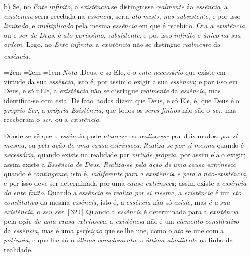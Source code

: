 \documentclass[12pt,a4paper]{article}
\newcommand{\pg}[1]{\thinspace\textup{[\,#1\,]}\thinspace}
\newcommand{\subp}[1]{\medskip\noindent#1)\quad}
\renewcommand\footnote[1]{%
    \stepcounter{footnote}\textsuperscript{\thefootnote}%
    \par
    {\footnotesize
     \leftskip=2em \rightskip=2em \parindent=1em
     \addvspace{\medskipamount}%
     \noindent\textit{Nota \thefootnote.}\enspace #1\par
     \addvspace{\medskipamount}}%
  }
\begin{document}
\subp{b} Se, no \emph{Ente infinito}, a \emph{existência} se distinguisse
\emph{realmente} da \emph{essência}, a \emph{existência} seria recebida na
\emph{essência}, seria \emph{ato misto}, \emph{não-subsistente}, e por isso
\emph{limitado}, e \emph{multiplicado} pela mesma \emph{essência} em que é
recebido. Ora a \emph{existência}, ou o \emph{ser de Deus}, é \emph{ato
puríssimo}, \emph{subsistente}, e por isso \emph{infinito} e \emph{único na sua
ordem}. Logo, no \emph{Ente infinito}, a \emph{existência} não se distingue
\emph{realmente} da \emph{essência}.\footnote{Deus, e só Ele, é o \emph{ente
necessário} que existe em virtude da sua \emph{essência}, isto é, por assim o
exigir a sua \emph{essência}; e por isso em Deus, e só nEle, a \emph{existência}
não se distingue \emph{realmente} da \emph{essência}, mas identifica-se com
esta. De fato, todos dizem \textemdash{} que Deus, e só Ele, é, \textemdash{}
que Deus é o \emph{próprio Ser}, a \emph{própria Existência}, \textemdash{} que
todos os \emph{seres finitos} não são o \emph{ser}, mas receberam o \emph{ser},
ou a \emph{existência}.

  Donde se vê que a \emph{essência} pode \emph{atuar-se} ou \emph{realizar-se}
  por dois modos: \emph{por si mesma}, ou \emph{pela ação de uma causa
  extrínseca}. \emph{Realiza-se por si mesma} quando é \emph{necessária}, quando
  existe na realidade por \emph{virtude própria}, por assim ela o exigir; assim
  existe a \emph{Essência de Deus}. \emph{Realiza-se pela ação de uma causa
  extrínseca} quando é \emph{contingente}, isto é, \emph{indiferente para a
  existência e para a não-existência}, e por isso deve ser determinada por uma
  \emph{causa extrínseca}; assim existe a \emph{essência do ente finito}.
  \textemdash{} Quando a \emph{essência} se \emph{realiza por si mesma}, a
  \emph{existência} é um \emph{ato constitutivo} da mesma \emph{essência}, isto
  é, a \emph{essência} não só \emph{existe}, mas \emph{é a sua existência}, o
  \emph{seu ser}. \pg{320} Quando a \emph{essência} é determinada para a
  \emph{existência} pela \emph{ação de uma causa extrínseca}, a \emph{existência}
  não é um \emph{elemento constitutivo} da \emph{essência}, mas é uma
  \emph{perfeição} que se lhe une, como o \emph{ato} se une com a
  \emph{potência}, e que lhe dá o \emph{último complemento}, a \emph{última
  atualidade} na linha da realidade.

}
\end{document}
